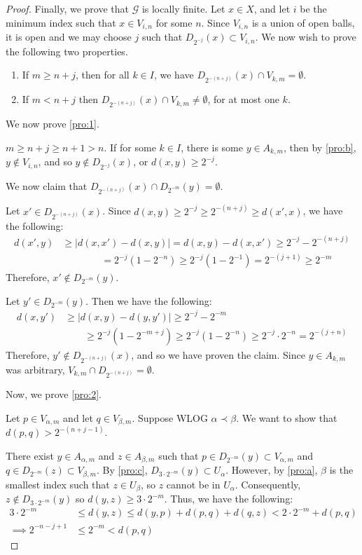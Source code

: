 \documentclass[openany, amssymb, psamsfonts]{amsart}
\theoremstyle{definition}
\numberwithin{equation}{section}
\begin{document}
\begin{proof}
  Finally, we prove that $\mathcal{G}$ is locally finite. Let $x \in X$, and let $i$ be the minimum index such that $x \in V_{i,n}$ for some $n$. Since $V_{i,n}$ is a union of open balls, it is open and we may choose $j$ such that $D_{2^{-j}}(x) \subset V_{i,n}$. We now wish to prove the following two properties.
  \begin{enumerate}
    \item \label{pro:1}
    If $m \ge n+j$, then for all $k \in I$, we have $D_{2^{-(n+j)}}(x) \cap V_{k,m} = \emptyset$. 
    \item \label{pro:2}
    If $m < n+j$ then $D_{2^{-(n+j)}}(x) \cap V_{k,m} \neq \emptyset$, for at most one $k$.
  \end{enumerate}
  We now prove \ref{pro:1}. 

  $m \ge n+j\ge n+1 > n$. If for some $k \in I$, there is some $y \in A_{k,m}$, then by \ref{pro:b}, $y \not \in V_{i,n}$, and so $y \not\in D_{2^{-j}}(x)$, or $d(x,y) \ge 2^{-j}$. 

  We now claim that $D_{2^{-(n+j)}}(x) \cap D_{2^{-m}}(y) = \emptyset$. 

  Let $x' \in D_{2^{-(n+j)}}(x)$. Since $d(x,y) \ge 2^{-j} \ge 2^{-(n+j)} \ge d(x',x)$, we have the following:
  \begin{align*} 
    d(x',y) &\ge |d(x,x') - d(x,y)| = d(x,y) - d(x,x') \ge 2^{-j} - 2^{-(n+j)}\\
            &\qquad \qquad= 2^{-j}(1- 2^{-n}) \ge 2^{-j}(1-2^{-1}) = 2^{-(j+1)}\ge 2^{-m}
  \end{align*}
  Therefore, $x'\not\in D_{2^{-m}}(y)$. 

  Let $y' \in D_{2^{-m}}(y)$. Then we have the following:
  \begin{align*}
    d(x,y') &\ge |d(x,y) - d(y,y')| \ge 2^{-j} - 2^{-m} \\
            &\qquad \ge 2^{-j}(1 - 2^{-m+j})\ge 2^{-j}(1 - 2^{-n})\ge 2^{-j} \cdot 2^{-n} = 2^{-(j+n)}
  \end{align*}
  Therefore, $y' \not\in D_{2^{-(n+j)}}(x)$, and so we have proven the claim. Since $y \in A_{k,m}$ was arbitrary, $V_{k,m} \cap D_{2^{-(n+j)}} = \emptyset$.  

  Now, we prove \ref{pro:2}. 

  Let $p \in V_{\alpha,m}$ and let $q \in V_{\beta,m}$. Suppose WLOG $\alpha \prec \beta$. We want to show that $d(p,q) > 2^{-(n+j - 1)}$. 

  There exist $y \in A_{\alpha, m}$ and $z \in A_{\beta, m}$ such that $p \in D_{2^{-m}}(y) \subset V_{\alpha,m}$ and $q \in D_{2^{-m}}(z) \subset V_{\beta, m}$. By \ref{pro:c}, $D_{3 \cdot 2^{-m}}(y) \subset U_\alpha$. However, by \ref{pro:a}, $\beta$ is the smallest index such that $z \in U_\beta$, so $z$ cannot be in $U_\alpha$. Consequently, $z \not\in D_{3\cdot 2^{-m}}(y)$ so $d(y,z) \ge 3 \cdot 2^{-m}$. Thus, we have the following:
  \begin{align*}
    3\cdot 2^{-m} &\le d(y,z) \le d(y,p) + d(p,q) + d(q,z) < 2 \cdot 2^{-m} + d(p,q)\\
    \implies  2^{-n - j + 1} &\le 2^{-m} < d(p,q)
  \end{align*}


\end{proof}
\end{document}
